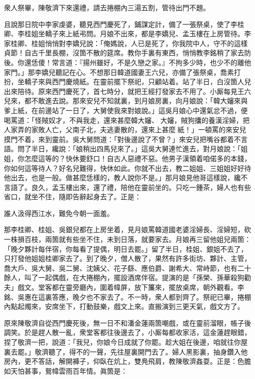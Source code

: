 衆人祭畢，陳敬濟下來還禮，請去捲棚內三湯五割，管待出門不題。

且說那日院中李家虔婆，聽見西門慶死了，鋪謀定計，{}備了一張祭桌，使了李桂卿、李桂姐坐轎子來上紙弔問。月娘不出來，都是李嬌兒、孟玉樓在上房管待。李家桂卿、桂姐悄悄對李嬌兒說：「俺媽說，人已是死了，你我院中人，守不的這樣貞節！自古千里長棚，沒箇不散的筵席。教你手裏有東西，悄悄教李銘稍了家去防後。你還恁傻！常言道：『揚州雖好，不是久戀之家。』不拘多少時，也少不的離他家門。」那李嬌兒聽記在心。不想那日韓道國妻王六兒，亦備了張祭桌，喬素打扮，坐轎子來與西門慶燒紙。在靈前擺下祭祀，只顧站着。站了半日，白沒箇人兒出來陪待。原來西門慶死了，首七時分，就把王經打發家去不用了。小厮每見王六兒來，都不敢進去說。那來安兒不知就裏，到月娘房裏，向月娘說：「韓大嬸來與爹上紙，在前邊站了一日了，大舅使我來對娘說。」這吳月娘心中還氣忿不過，便喝罵道：「怪賊奴才，不與我走，還來甚麼韓大嬸、𣭈大嬸，賊狗攮的養漢淫婦，把人家弄的家敗人亡，父南子北，夫逃妻散的，還來上甚麼𣭈紙！」一頓罵的來安兒摸門不着，來到靈前。吳大舅問道：「對後邊說了不曾？」來安兒把嘴谷都着不言語。問了半日，纔說：「娘稍出四馬兒來了。」這吳大舅連忙進去，對月娘說：「姐姐，你怎麼這等的？快休要舒口！自古人惡禮不惡。他男子漢領着咱偌多的本錢，你如何這等待人？好名兒難得，快休如此。你就不出去，教二姐姐、三姐姐好好待他出去，也是一般。做甚麼恁樣的，教人說你不是。」那月娘見他哥這樣說，纔不言語了。良久，孟玉樓出來，還了禮，陪他在靈前坐的。只吃一鍾茶，婦人也有些省口，就坐不住，隨即告辭起身去了。正是：

\begin{myquote}
誰人汲得西江水，難免今朝一面羞。
\end{myquote}

那李桂卿、桂姐、吳銀兒都在上房坐着，見月娘罵韓道國老婆淫婦長、淫婦短，砍一株損百枝，兩箇就有些坐不住，未到日落，就要家去。月娘再三留他姐兒兩箇：「晚夕夥計每伴宿，你每看了提偶，明日去罷。」留了半日，桂姐、銀姐不去了，只打發他姐姐桂卿家去了。到了晚夕，僧人散了，果然有許多街坊、夥計、主管，喬大戶、吳大舅、吳二舅、沈姨父、花子繇、應伯爵、謝希大、常峙節，也有二十餘人，叫了一起偶戲，在大捲棚內，擺設酒席伴宿。提演的是「孫榮、孫華殺狗勸夫」戲文。堂客都在靈旁廳內，圍着幃屏，放下簾來，擺放桌席，朝外觀看。李銘、吳惠在這裏答應，晚夕也不家去了。不一時，衆人都到齊了。祭祀已畢，捲棚內點起燭來，安席坐下，打動鼓樂，戲文上來。直搬演到三更天氣，戲文方了。

原來陳敬濟自從西門慶死後，無一日不和潘金蓮兩箇嘲戲，或在靈前溜眼，帳子後調笑。於是趕人散一亂，衆堂客都往後邊去了，小厮每都收家活，這金蓮趕眼錯，捏了敬濟一把，說道：「我兒，你娘今日成就了你罷。趁大姐在後邊，咱就往你屋裏去罷。」敬濟聽了，得不的一聲，先往屋裏開門去了。婦人黑影裏，抽身鑽入他房內，更不答話，解開褲子，仰臥在炕上，{}雙鳧飛肩，教陳敬濟姦耍。正是：色膽如天怕甚事，鴛幃雲雨百年情。眞箇是：

